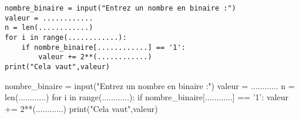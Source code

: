 \documentclass[a4paper,12pt,french]{book}
\begin{document}
\begin{verbatim}
nombre_binaire = input("Entrez un nombre en binaire :")
valeur = ............
n = len(............)
for i in range(............):
    if nombre_binaire[............] == '1':
        valeur += 2**(............)
print("Cela vaut",valeur)
\end{verbatim}

\begin{pythoncode}
nombre_binaire = input("Entrez un nombre en binaire :")
valeur = ............
n = len(............)
for i in range(............):
    if nombre_binaire[............] == '1':
        valeur += 2**(............)
print("Cela vaut",valeur)
\end{pythoncode}
\end{document}
